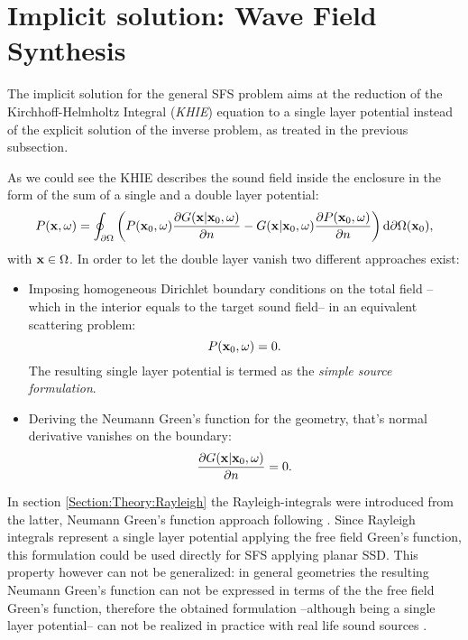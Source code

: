 \section{Implicit solution: Wave Field Synthesis}

The implicit solution for the general SFS problem aims at the reduction of the Kirchhoff-Helmholtz Integral (\emph{KHIE}) equation to a single layer potential instead of the explicit solution of the inverse problem, as treated in the previous subsection. 

As we could see the KHIE describes the sound field inside the enclosure in the form of the sum of a single and a double layer potential:
\begin{equation}
P(\mathbf{x},\omega) = 
\oint_{\partial \Omega}  \left( 
P(\mathbf{x}_0,\omega)  \frac{\partial G(\mathbf{x}|\mathbf{x}_0,\omega)}{\partial n}  -  
G(\mathbf{x}|\mathbf{x}_0,\omega) \frac{\partial P(\mathbf{x}_0,\omega)}{\partial n} 
\right)   \mathrm{d} \partial \Omega ( \mathbf{x}_0),
\end{equation}
with $\mathbf{x} \in \Omega$.
In order to let the double layer vanish two different approaches exist:
\begin{itemize}
\item Imposing homogeneous Dirichlet boundary conditions on the total field --which in the interior equals to the target sound field-- in an equivalent scattering problem: 
\begin{equation}
P(\mathbf{x}_0,\omega) = 0.
\end{equation}
The resulting single layer potential is termed as the \emph{simple source formulation}.
\item Deriving the Neumann Green's function for the geometry, that's normal derivative vanishes on the boundary:
\begin{equation}
\frac{\partial G(\mathbf{x}|\mathbf{x}_0,\omega)}{\partial n}  = 0.
\end{equation}
\end{itemize}
In section \ref{Section:Theory:Rayleigh} the Rayleigh-integrals were introduced from the latter, Neumann Green's function approach following \cite{Berkhout1984}. Since Rayleigh integrals represent a single layer potential applying the free field Green's function, this formulation could be used directly for SFS applying planar SSD. 
This property however can not be generalized: in general geometries the resulting Neumann Green's function can not be expressed in terms of the the free field Green's function, therefore the obtained formulation --although being a single layer potential-- can not be realized in practice with real life sound sources \cite{Schultz2014:Comparing_approaches}.

